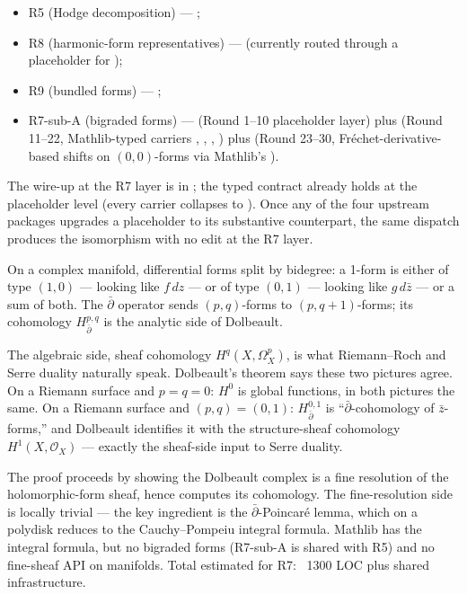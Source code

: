 \begin{itemize}
\item R5 (Hodge decomposition) ---
  ;
\item R8 (harmonic-form representatives) ---
  (currently routed through a  placeholder for
  );
\item R9 (bundled forms) ---
  ;
\item R7-sub-A (bigraded forms) ---
  (Round 1--10 placeholder layer) plus
   (Round 11--22, Mathlib-typed
  carriers , ,
  , ) plus
   (Round 23--30,
  Fr\'echet-derivative-based shifts on \((0,0)\)-forms via
  Mathlib's ).
\end{itemize}

The wire-up at the R7 layer is in
; the typed
contract 
already holds at the placeholder level (every carrier collapses
to ).  Once any of the four upstream packages
upgrades a  placeholder to its substantive
counterpart, the same dispatch produces the isomorphism
with no edit at the R7 layer.

\begin{layman}
On a complex manifold, differential forms split by bidegree:
a 1-form is either of type \((1,0)\) --- looking like \(f \, dz\) --- or
of type \((0,1)\) --- looking like \(g \, d\bar z\) --- or a sum of both.
The \(\bar\partial\) operator sends \((p,q)\)-forms to
\((p,q+1)\)-forms; its cohomology \(H^{p,q}_{\bar\partial}\) is the
analytic side of Dolbeault.

The algebraic side, sheaf cohomology \(H^q(X, \Omega^p_X)\), is what
Riemann--Roch and Serre duality naturally speak.  Dolbeault's theorem
says these two pictures agree.  On a Riemann surface and \(p=q=0\):
\(H^0\) is global functions, in both pictures the same.  On a Riemann
surface and \((p,q) = (0,1)\): \(H^{0,1}_{\bar\partial}\) is
``\(\bar\partial\)-cohomology of \(\bar z\)-forms,'' and Dolbeault
identifies it with the structure-sheaf cohomology
\(H^1(X, \mathcal{O}_X)\) --- exactly the sheaf-side input to Serre
duality.

The proof proceeds by showing the Dolbeault complex is a fine
resolution of the holomorphic-form sheaf, hence computes its
cohomology.  The fine-resolution side is locally trivial --- the key
ingredient is the \(\bar\partial\)-Poincar\'e lemma, which on a
polydisk reduces to the Cauchy--Pompeiu integral formula.  Mathlib
has the integral formula, but no bigraded forms (R7-sub-A is shared
with R5) and no fine-sheaf API on manifolds.  Total estimated for R7:
~1300 LOC plus shared infrastructure.
\end{layman}

